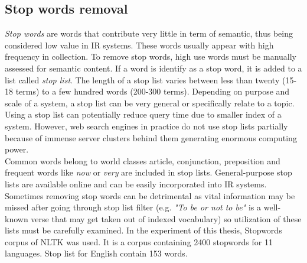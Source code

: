\subsection{Stop words removal}
\textit{Stop words} are words that contribute very little in term of semantic, thus being considered low value in IR systems. These words usually appear with high frequency in collection. To remove stop words, high use words must be manually assessed for semantic content. If a word is identify as a stop word, it is added to a list called \textit{stop list}. The length of a stop list varies between less than twenty (15-18 terms) to a few hundred words (200-300 terms). Depending on purpose and scale of a system, a stop list can be very general or specifically relate to a topic.\\
Using a stop list can potentially reduce query time due to smaller index of a system. However, web search engines in practice do not use stop lists partially because of immense server clusters behind them generating enormous computing power. \\
Common words belong to world classes article, conjunction, preposition and frequent words like \textit{now} or \textit{very} are included in stop lists. General-purpose stop lists are available online and can be easily incorporated into IR systems. Sometimes removing stop words can be detrimental as vital information may be missed after going through stop list filter (e.g. \textit{"To be or not to be"} is a well-known verse that may get taken out of indexed vocabulary) so utilization of these lists must be carefully examined. In the experiment of this thesis, Stopwords corpus of NLTK was used. It is a corpus containing 2400 stopwords for 11 languages. Stop list for English contain 153 words.\\

